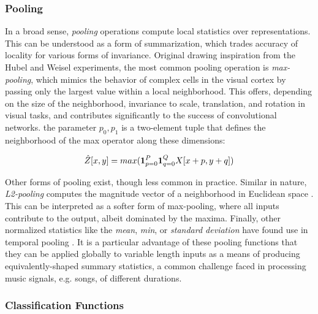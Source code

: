 \subsubsection{Pooling}


In a broad sense, \emph{pooling} operations compute local statistics over representations.
This can be understood as a form of summarization, which trades accuracy of locality for various forms of invariance.
Original drawing inspiration from the Hubel and Weisel experiments, the most common pooling operation is \emph{max-pooling}, which mimics the behavior of complex cells in the visual cortex by passing only the largest value within a local neighborhood.
This offers, depending on the size of the neighborhood, invariance to scale, translation, and rotation in visual tasks, and contributes significantly to the success of convolutional networks.
the parameter $p_0, p_1$ is a two-element tuple that defines the neighborhood of the max operator along these dimensions:


\begin{equation}
\label{eq:maxpool}
\small
\hat{Z}[x, y] = max (\mathbf{1}_{p=0}^{P} \mathbf{1}_{q=0}^{Q} X[x + p, y + q])
\end{equation}


Other forms of pooling exist, though less common in practice.
Similar in nature, \emph{L2-pooling} computes the magnitude vector of a neighborhood in Euclidean space \cite{LeCunStudent}.
This can be interpreted as a softer form of max-pooling, where all inputs contribute to the output, albeit dominated by the maxima.
Finally, other normalized statistics like the \emph{mean}, \emph{min}, or \emph{standard deviation} have found use in temporal pooling \cite{Hamel2011}.
It is a particular advantage of these pooling functions that they can be applied globally to variable length inputs as a means of producing equivalently-shaped summary statistics, a common challenge faced in processing music signals, e.g. songs, of different durations.


\subsubsection{Classification Functions}

